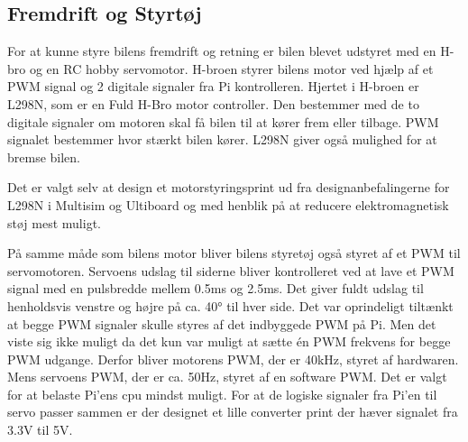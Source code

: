 \subsection{Fremdrift og Styrtøj}
For at kunne styre bilens fremdrift og retning er bilen blevet udstyret med en H-bro\cite{lib:wikiHbro} og en RC hobby servomotor\cite{lib:wiki-RC-Servo}.
H-broen styrer bilens motor ved hjælp af et PWM signal og 2 digitale signaler fra Pi kontrolleren. 
Hjertet i H-broen er L298N\cite{lib:L298N_datablad}, som er en Fuld H-Bro motor controller. 
Den bestemmer med de to digitale signaler om motoren skal få bilen til at kører frem eller tilbage. 
PWM signalet bestemmer hvor stærkt bilen kører. 
L298N giver også mulighed for at bremse bilen.

Det er valgt selv at design et motorstyringsprint ud fra designanbefalingerne for L298N  i Multisim og Ultiboard og med henblik på at reducere elektromagnetisk støj mest muligt.

På samme måde som bilens motor bliver bilens styretøj også styret af et PWM til servomotoren. 
Servoens udslag til siderne bliver kontrolleret ved at lave et PWM signal med en pulsbredde mellem 0.5ms og 2.5ms. 
Det giver fuldt udslag til henholdsvis venstre og højre på ca. 40\si{\degree} til hver side.
Det var oprindeligt tiltænkt at begge PWM signaler skulle styres af det indbyggede PWM på Pi. 
Men det viste sig ikke muligt da det kun var muligt at sætte én PWM frekvens for begge PWM udgange. 
Derfor bliver motorens PWM, der er 40kHz, styret af hardwaren. 
Mens servoens PWM, der er ca. 50Hz, styret af en software PWM. 
Det er valgt for at belaste Pi'ens cpu mindst muligt.
For at de logiske signaler fra Pi'en til servo passer sammen er der designet et lille converter print der hæver signalet fra 3.3V til 5V.
